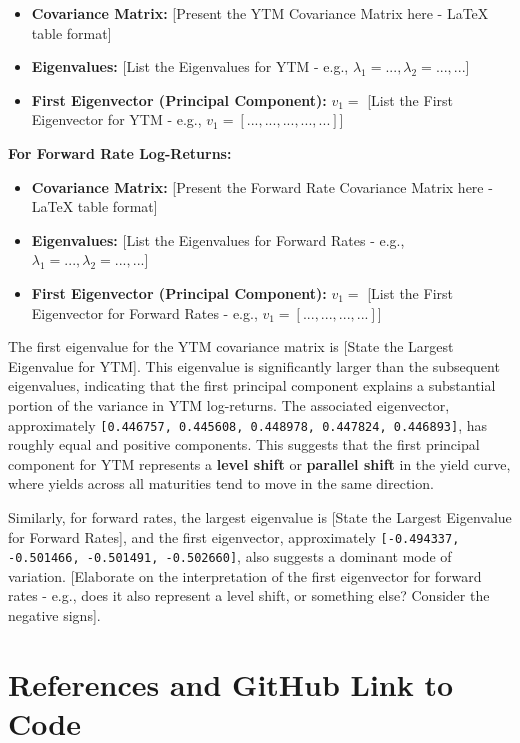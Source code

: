 \documentclass{article}
\begin{document}
\begin{enumerate}
        \begin{itemize}
            \item \textbf{Covariance Matrix:}  [Present the YTM Covariance Matrix here - LaTeX table format]
            \item \textbf{Eigenvalues:} [List the Eigenvalues for YTM - e.g.,  $\lambda_1 = ..., \lambda_2 = ..., ...$]
            \item \textbf{First Eigenvector (Principal Component):} $v_1 = $ [List the First Eigenvector for YTM - e.g., $v_{1} = [..., ..., ..., ..., ...]$]
        \end{itemize}

       \textbf{For Forward Rate Log-Returns:}

        \begin{itemize}
            \item \textbf{Covariance Matrix:} [Present the Forward Rate Covariance Matrix here - LaTeX table format]
            \item \textbf{Eigenvalues:} [List the Eigenvalues for Forward Rates - e.g.,  $\lambda_1 = ..., \lambda_2 = ..., ...$]
            \item \textbf{First Eigenvector (Principal Component):} $v_1 = $ [List the First Eigenvector for Forward Rates - e.g., $v_{1} = [..., ..., ..., ...]$]
        \end{itemize}

        The first eigenvalue for the YTM covariance matrix is [State the Largest Eigenvalue for YTM]. This eigenvalue is significantly larger than the subsequent eigenvalues, indicating that the first principal component explains a substantial portion of the variance in YTM log-returns. The associated eigenvector, approximately \texttt{[0.446757, 0.445608, 0.448978, 0.447824, 0.446893]}, has roughly equal and positive components. This suggests that the first principal component for YTM represents a \textbf{level shift} or \textbf{parallel shift} in the yield curve, where yields across all maturities tend to move in the same direction.

         Similarly, for forward rates, the largest eigenvalue is [State the Largest Eigenvalue for Forward Rates], and the first eigenvector, approximately \texttt{[-0.494337, -0.501466, -0.501491, -0.502660]}, also suggests a dominant mode of variation.  [Elaborate on the interpretation of the first eigenvector for forward rates - e.g., does it also represent a level shift, or something else? Consider the negative signs].

\end{enumerate}

\section*{References and GitHub Link to Code}
\end{document}
